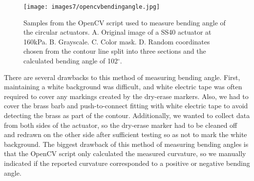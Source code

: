 \clearpage
\begin{figure}[ht]
    \centering
     \texttt{[image: images7/opencvbendingangle.jpg]}
    \caption{Samples from the OpenCV script used to measure bending angle of the circular actuators. A. Original image of a SS40 actuator at 160kPa. B. Grayscale. C. Color mask. D. Random coordinates chosen from the contour line split into three sections and the calculated bending angle of 102$^\circ$.}
    \label{fig:opencvbendingangle}
\end{figure}

There are several drawbacks to this method of measuring bending angle. First, maintaining a white background was difficult, and white electric tape was often required to cover any markings created by the dry-erase markers. Also, we had to cover the brass barb and push-to-connect fitting with white electric tape to avoid detecting the brass as part of the contour. Additionally, we wanted to collect data from both sides of the actuator, so the dry-erase marker had to be cleaned off and redrawn on the other side after sufficient testing so as not to mark the white background. The biggest drawback of this method of measuring bending angles is that the OpenCV script only calculated the measured curvature, so we manually indicated if the reported curvature corresponded to a positive or negative bending angle. 